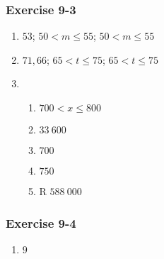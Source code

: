 {\begin{multicols}{3}
\subsubsection*{Exercise 9-3} %

  \begin{enumerate}[noitemsep, label=\textbf{\arabic*}.]

  \item %
$53$; $50<m \leq 55$; $50 < m \leq 55$
  \item %
$71,66$; $65 < t \leq 75$; $65 < t \leq 75$
\item %
\begin{enumerate}[noitemsep, label=\textbf{(\alph*)} ]
\item $700 < x\leq800$%
\item $33~600$%
\item $700$ %
\item $750$%
\item R $588~ 000$%
\end{enumerate}

  \end{enumerate}



\subsubsection*{Exercise 9-4} %
  \begin{enumerate}[noitemsep, label=\textbf{\arabic*}.]

  \item $9$%


\end{enumerate}
\end{multicols}}
